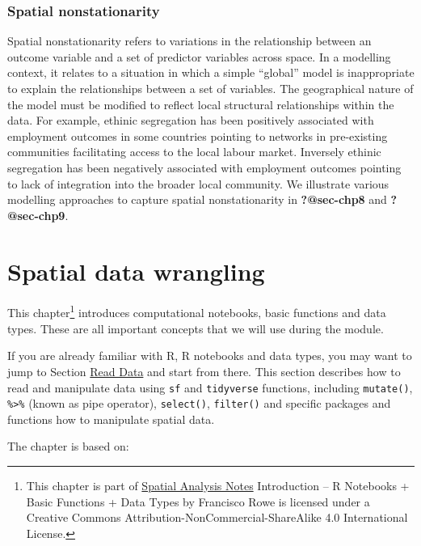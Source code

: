 \documentclass[
  letterpaper,
  krantz2]{style/krantz}
\begin{document}
\hypertarget{spatial-nonstationarity}{%
\subsection{Spatial nonstationarity}\label{spatial-nonstationarity}}

Spatial nonstationarity refers to variations in the relationship between
an outcome variable and a set of predictor variables across space. In a
modelling context, it relates to a situation in which a simple
``global'' model is inappropriate to explain the relationships between a
set of variables. The geographical nature of the model must be modified
to reflect local structural relationships within the data. For example,
ethinic segregation has been positively associated with employment
outcomes in some countries pointing to networks in pre-existing
communities facilitating access to the local labour market. Inversely
ethinic segregation has been negatively associated with employment
outcomes pointing to lack of integration into the broader local
community. We illustrate various modelling approaches to capture spatial
nonstationarity in \textbf{?@sec-chp8} and \textbf{?@sec-chp9}.

\hypertarget{spatial-data-wrangling}{%
\chapter{Spatial data wrangling}\label{spatial-data-wrangling}}

This chapter\footnote{This chapter is part of \href{index.html}{Spatial
  Analysis Notes} {Introduction -- R Notebooks + Basic Functions + Data
  Types} by Francisco Rowe is licensed under a Creative Commons
  Attribution-NonCommercial-ShareAlike 4.0 International License.}
introduces computational notebooks, basic functions and data types.
These are all important concepts that we will use during the module.

If you are already familiar with R, R notebooks and data types, you may
want to jump to Section \protect\hyperlink{sec_readdata}{Read Data} and
start from there. This section describes how to read and manipulate data
using \texttt{sf} and \texttt{tidyverse} functions, including
\texttt{mutate()}, \texttt{\%\textgreater{}\%} (known as pipe operator),
\texttt{select()}, \texttt{filter()} and specific packages and functions
how to manipulate spatial data.

The chapter is based on:
\end{document}

